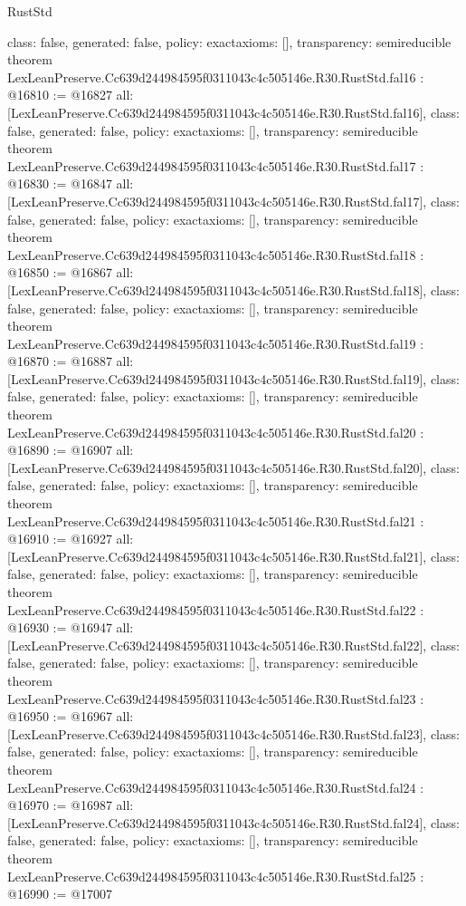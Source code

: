 \begin{lexlean}{RustStd}
\begin{coremodule}
{  class: false,
  generated: false,
  policy: exact{axioms: []},
  transparency: semireducible
}
theorem LexLeanPreserve.Cc639d244984595f0311043c4c505146e.R30.RustStd.fal16 : @16810 := @16827 {
  all: [LexLeanPreserve.Cc639d244984595f0311043c4c505146e.R30.RustStd.fal16],
  class: false,
  generated: false,
  policy: exact{axioms: []},
  transparency: semireducible
}
theorem LexLeanPreserve.Cc639d244984595f0311043c4c505146e.R30.RustStd.fal17 : @16830 := @16847 {
  all: [LexLeanPreserve.Cc639d244984595f0311043c4c505146e.R30.RustStd.fal17],
  class: false,
  generated: false,
  policy: exact{axioms: []},
  transparency: semireducible
}
theorem LexLeanPreserve.Cc639d244984595f0311043c4c505146e.R30.RustStd.fal18 : @16850 := @16867 {
  all: [LexLeanPreserve.Cc639d244984595f0311043c4c505146e.R30.RustStd.fal18],
  class: false,
  generated: false,
  policy: exact{axioms: []},
  transparency: semireducible
}
theorem LexLeanPreserve.Cc639d244984595f0311043c4c505146e.R30.RustStd.fal19 : @16870 := @16887 {
  all: [LexLeanPreserve.Cc639d244984595f0311043c4c505146e.R30.RustStd.fal19],
  class: false,
  generated: false,
  policy: exact{axioms: []},
  transparency: semireducible
}
theorem LexLeanPreserve.Cc639d244984595f0311043c4c505146e.R30.RustStd.fal20 : @16890 := @16907 {
  all: [LexLeanPreserve.Cc639d244984595f0311043c4c505146e.R30.RustStd.fal20],
  class: false,
  generated: false,
  policy: exact{axioms: []},
  transparency: semireducible
}
theorem LexLeanPreserve.Cc639d244984595f0311043c4c505146e.R30.RustStd.fal21 : @16910 := @16927 {
  all: [LexLeanPreserve.Cc639d244984595f0311043c4c505146e.R30.RustStd.fal21],
  class: false,
  generated: false,
  policy: exact{axioms: []},
  transparency: semireducible
}
theorem LexLeanPreserve.Cc639d244984595f0311043c4c505146e.R30.RustStd.fal22 : @16930 := @16947 {
  all: [LexLeanPreserve.Cc639d244984595f0311043c4c505146e.R30.RustStd.fal22],
  class: false,
  generated: false,
  policy: exact{axioms: []},
  transparency: semireducible
}
theorem LexLeanPreserve.Cc639d244984595f0311043c4c505146e.R30.RustStd.fal23 : @16950 := @16967 {
  all: [LexLeanPreserve.Cc639d244984595f0311043c4c505146e.R30.RustStd.fal23],
  class: false,
  generated: false,
  policy: exact{axioms: []},
  transparency: semireducible
}
theorem LexLeanPreserve.Cc639d244984595f0311043c4c505146e.R30.RustStd.fal24 : @16970 := @16987 {
  all: [LexLeanPreserve.Cc639d244984595f0311043c4c505146e.R30.RustStd.fal24],
  class: false,
  generated: false,
  policy: exact{axioms: []},
  transparency: semireducible
}
theorem LexLeanPreserve.Cc639d244984595f0311043c4c505146e.R30.RustStd.fal25 : @16990 := @17007 {
}
\end{coremodule}
\end{lexlean}
